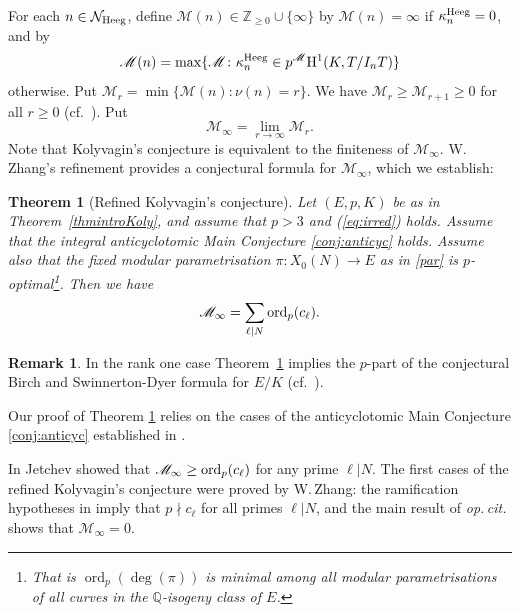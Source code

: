 \documentclass[10pt,reqno]{amsart}
\numberwithin{equation}{section}
\theoremstyle{plain}
\theoremstyle{definition}
\newtheorem*{rmk-intro}{Remark}
\theoremstyle{definition}
\theoremstyle{plain}
\theoremstyle{plain}
\theoremstyle{plain}
\theoremstyle{plain}
\theoremstyle{plain}
\newtheorem{thmintro}{Theorem}
\theoremstyle{plain}
\DeclareMathOperator{\ord}{ord}
\newcommand{\Z}{\mathbb{Z}}
\newcommand{\Q}{\mathbb{Q}}
\newcommand{\rH}{\mathrm{H}}
\begin{document}
For each $n\in\mathcal{N}_{\rm Heeg}$, define $\mathscr{M}(n)\in\Z_{\geq 0}\cup\{\infty\}$ by $\mathscr{M}(n)=\infty$ if $\kappa_n^{\rm Heeg}=0$, and by
\[
\mathscr{M}(n)=\max\{\mathscr{M}\colon\kappa_n^{\rm Heeg}\in p^{\mathscr{M}}\rH^1(K,T/I_nT)\}
\]
otherwise. Put $\mathscr{M}_{r}=\min\{\mathscr{M}(n)\colon\nu(n)=r\}$. 
We have $\mathscr{M}_{r}\geq\mathscr{M}_{r+1}\geq 0$ for all $r\geq 0$ (cf.~\cite{kolystructure}).
 Put 
\[
\mathscr{M}_{\infty}=\lim_{r\to\infty}\mathscr{M}_{r}.
\]
Note that Kolyvagin's conjecture is equivalent to the finiteness of $\mathscr{M}_{\infty}$. 
W. Zhang's refinement \cite[Conj.~4.5]{zhang_ind} provides a conjectural formula for $\mathscr{M}_{\infty}$, 
which we establish:
\begin{thmintro}[Refined Kolyvagin's conjecture]\label{thmintroKoly-div}
Let $(E,p,K)$ be as in Theorem~\ref{thmintroKoly}, and assume that $p>3$ and {\rm (\ref{eq:irred})} holds. Assume that the integral anticyclotomic Main Conjecture \ref{conj:anticyc} holds.
Assume also that the fixed modular parametrisation $\pi: X_{0}(N) \to E$ as in 
\eqref{par} is $p$-optimal\footnote{That is 
$\ord_p(\deg(\pi))$ is minimal among all modular parametrisations of all curves in the $\Q$-isogeny class of $E$. }. 
Then we have
\[
\mathscr{M}_{\infty}=\sum_{\ell\mid N}{\rm ord}_p(c_\ell).
\]
\end{thmintro}
\begin{rmk-intro}
In the rank one case Theorem~\ref{thmintroKoly-div} implies the $p$-part of the conjectural Birch and Swinnerton-Dyer formula for $E/K$ (cf.~\cite[Theorem~1.6]{zhang_ind}).
\end{rmk-intro}


Our proof  of Theorem \ref{thmintroKoly-div} 
relies on the cases of 
the anticyclotomic Main 
Conjecture \ref{conj:anticyc} established in \cite{bcs}. 


In \cite{jetchev} Jetchev 
showed that $\mathscr{M}_{\infty}\geq {\rm ord}_p(c_\ell)$ for any prime $\ell\vert N$. The first cases of the refined Kolyvagin's conjecture were proved by W.\,Zhang: the ramification hypotheses in \cite{zhang_ind} imply that $p\nmid c_\ell$ for all primes $\ell\vert N$, and the main result of \emph{op.\,cit.} shows that $\mathscr{M}_{\infty}=0$.
\end{document}
